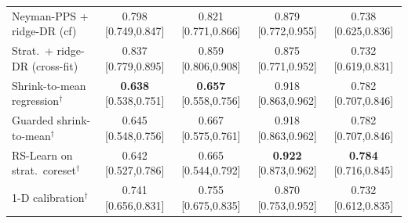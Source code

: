 \begin{tabular}{l cccc}
Neyman-PPS + ridge-DR (cf) & 0.798 {\scriptsize[0.749,0.847]} & 0.821 {\scriptsize[0.771,0.866]} & 0.879 {\scriptsize[0.772,0.955]} & 0.738 {\scriptsize[0.625,0.836]} \\
Strat.\ + ridge-DR (cross-fit) & 0.837 {\scriptsize[0.779,0.895]} & 0.859 {\scriptsize[0.806,0.908]} & 0.875 {\scriptsize[0.771,0.952]} & 0.732 {\scriptsize[0.619,0.831]} \\
Shrink-to-mean regression$^\dagger$ & \textbf{0.638} {\scriptsize[0.538,0.751]} & \textbf{0.657} {\scriptsize[0.558,0.756]} & 0.918 {\scriptsize[0.863,0.962]} & 0.782 {\scriptsize[0.707,0.846]} \\
Guarded shrink-to-mean$^\dagger$ & 0.645 {\scriptsize[0.548,0.756]} & 0.667 {\scriptsize[0.575,0.761]} & 0.918 {\scriptsize[0.863,0.962]} & 0.782 {\scriptsize[0.707,0.846]} \\
RS-Learn on strat.\ coreset$^\dagger$ & 0.642 {\scriptsize[0.527,0.786]} & 0.665 {\scriptsize[0.544,0.792]} & \textbf{0.922} {\scriptsize[0.873,0.962]} & \textbf{0.784} {\scriptsize[0.716,0.845]} \\
1-D calibration$^\dagger$ & 0.741 {\scriptsize[0.656,0.831]} & 0.755 {\scriptsize[0.675,0.835]} & 0.870 {\scriptsize[0.753,0.952]} & 0.732 {\scriptsize[0.612,0.835]} \\
\bottomrule
\end{tabular}
